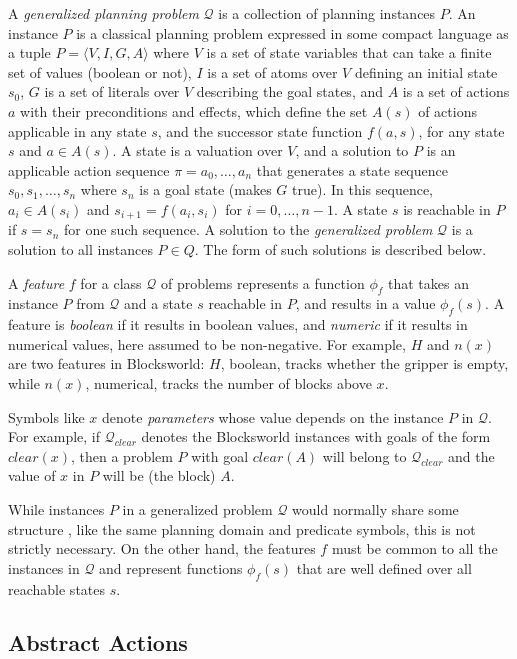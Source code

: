 \documentclass[letterpaper]{article} %
\newcommand{\tup}[1]{\langle #1 \rangle}
\newcommand{\Q}{\mathcal{Q}}
\begin{document}
A \emph{generalized planning problem} $\Q$ is a collection of planning instances $P$.
An instance $P$ is a  classical planning problem expressed in some compact language
as a tuple $P=\tup{V,I,G,A}$ where $V$ is a set of state variables that can take a
finite set of values (boolean or not), $I$ is a set of atoms over $V$ defining an
initial state $s_0$, $G$ is a set of literals over $V$ describing the goal
states, and $A$ is a set of actions $a$ with their preconditions and effects, which
define the set $A(s)$ of actions applicable in any state $s$, and the successor
state function $f(a,s)$, for any state $s$ and $a \in A(s)$.
A state is a valuation over $V$, and a solution to $P$ is an applicable action
sequence $\pi=a_0,\ldots,a_n$ that generates  a state sequence $s_0,s_1,\ldots,s_{n}$
where $s_n$ is a goal state (makes $G$ true). In this sequence, $a_i \in A(s_i)$
and $s_{i+1}=f(a_i,s_i)$ for $i=0, \ldots, n-1$. A state $s$ is reachable in $P$
if $s=s_n$ for one such sequence. A solution to the \emph{generalized problem}
$\Q$ is a solution to all instances $P \in Q$. The form of such solutions is
described below.

A \emph{feature} $f$ for a class $\Q$ of problems represents a function $\phi_f$
that takes an instance $P$ from $\Q$ and a state $s$ reachable in $P$, and results
in a value $\phi_f(s)$.
A feature is \emph{boolean} if it results in boolean values, and \emph{numeric}
if it results in numerical values, here assumed to be non-negative.
For example, $H$ and $n(x)$ are two features in Blocksworld:
$H$, boolean, tracks whether the gripper is empty, while
$n(x)$, numerical, tracks the number of blocks above $x$.

Symbols like $x$ denote \emph{parameters} whose value depends on the
instance $P$ in $\Q$. For example, if $\Q_{clear}$ denotes the Blocksworld
instances with goals of the form $clear(x)$, then a problem
$P$ with goal $clear(A)$ will belong to $\Q_{clear}$ and
the value of $x$ in $P$ will be (the block) $A$.

While instances $P$ in a generalized problem $\Q$ would normally share some structure \cite{bonet:ijcai2015},
like the same planning domain and predicate symbols, this is not strictly  necessary.
On the other hand,  the features $f$  must be common to all the instances  in $\Q$ and
represent functions $\phi_f(s)$ that are well defined over all reachable states $s$.


\subsection{Abstract Actions}
\end{document}
